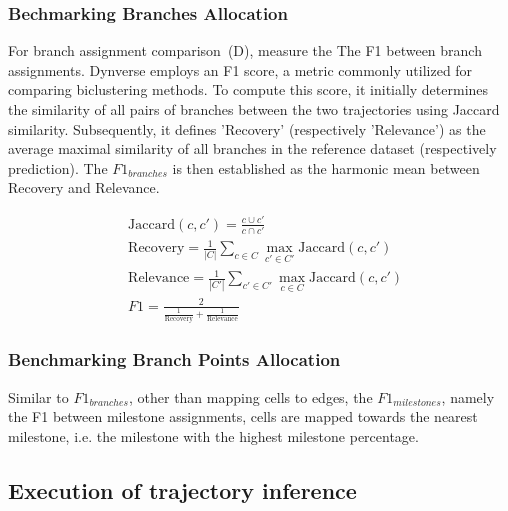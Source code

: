 \subsubsection{Bechmarking Branches Allocation}
For branch assignment comparison~(D), measure the The F1 between branch assignments. Dynverse employs an F1 score, a metric commonly utilized for comparing biclustering methods. To compute this score, it initially determines the similarity of all pairs of branches between the two trajectories using Jaccard similarity. Subsequently, it defines 'Recovery' (respectively 'Relevance') as the average maximal similarity of all branches in the reference dataset (respectively prediction). The $F1_{branches}$ is then established as the harmonic mean between Recovery and Relevance.

\begin{equation}
\label{eqn:corrdist}
\begin{aligned}
& \text{Jaccard}(c, c')  = \frac{c\cup c'}{c\cap c'} \\
& \text{Recovery} = \frac{1}{|C|}\sum_{c\in C} \max_{c'\in C'} \text{Jaccard}(c, c') \\
& \text{Relevance} = \frac{1}{|C'|}\sum_{c' \in C'} \max_{c\in C} \text{Jaccard}(c, c')\\
& F1 = \frac{2}{\frac{1}{\text{Recovery}} + \frac{1}{\text{Relevance}}}
\end{aligned}
\end{equation}

\subsubsection{Benchmarking Branch Points Allocation}
Similar to $F1_{branches}$, other than mapping cells to edges, the $F1_{milestones}$, namely the F1 between milestone assignments, cells are mapped towards the nearest milestone, i.e. the milestone with the highest milestone percentage.


\subsection{Execution of trajectory inference}
\label{chapter:PHLOWER_bench:exe}
